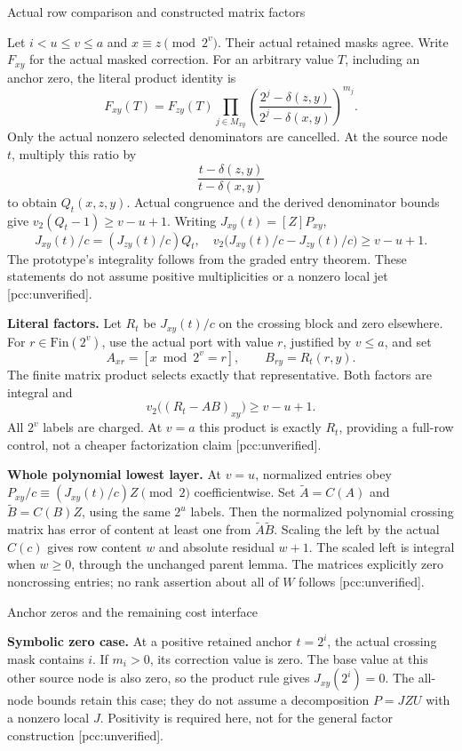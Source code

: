 \documentclass[10pt]{article}
\begin{document}
\newpage
\begin{center}{\Large Actual row comparison and constructed matrix factors}\end{center}
Let $i<u\le v\le a$ and $x\equiv z\pmod{2^v}$. Their actual retained
masks agree. Write $F_{xy}$ for the actual masked correction.
For an arbitrary value $T$, including an anchor zero, the
literal product identity is
\[
 F_{xy}(T)=F_{zy}(T)\prod_{j\in M_{xy}}
 \left(\frac{2^j-\delta(z,y)}{2^j-\delta(x,y)}\right)^{m_j}.
\]
Only the actual nonzero selected denominators are cancelled.
At the source node $t$, multiply this ratio by
\[
 \frac{t-\delta(z,y)}{t-\delta(x,y)}
\]
to obtain $Q_t(x,z,y)$. Actual congruence and the derived denominator bounds
give $v_2(Q_t-1)\ge v-u+1$. Writing $J_{xy}(t)=[Z]P_{xy}$,
\[
 J_{xy}(t)/c=(J_{zy}(t)/c)Q_t,\quad
 v_2\bigl(J_{xy}(t)/c-J_{zy}(t)/c\bigr)\ge v-u+1.
\]
The prototype's integrality follows from the graded entry theorem. These
statements do not assume positive multiplicities or a nonzero local jet
[pcc:unverified].

\textbf{Literal factors.} Let $R_t$ be $J_{xy}(t)/c$ on the crossing block
and zero elsewhere. For $r\in\mathrm{Fin}(2^v)$, use the actual port with
value $r$, justified by $v\le a$, and set
\[
 A_{xr}=[x\bmod2^v=r],\qquad B_{ry}=R_t(r,y).
\]
The finite matrix product selects exactly that representative. Both factors
are integral and
\[
 v_2\bigl((R_t-AB)_{xy}\bigr)\ge v-u+1.
\]
All $2^v$ labels are charged. At $v=a$ this product is exactly $R_t$,
providing a full-row control, not a cheaper factorization claim
[pcc:unverified].

\textbf{Whole polynomial lowest layer.} At $v=u$, normalized entries obey
$P_{xy}/c\equiv (J_{xy}(t)/c)Z\pmod2$ coefficientwise. Set
$\widetilde A=C(A)$ and $\widetilde B=C(B)Z$, using the same $2^u$ labels.
Then the normalized polynomial crossing matrix has error of content at least one from
$\widetilde A\widetilde B$. Scaling the left by the actual $C(c)$ gives
row content $w$ and absolute residual $w+1$. The scaled left is integral
when $w\ge0$, through the unchanged parent lemma. The matrices explicitly
zero noncrossing entries; no rank assertion about all of $W$ follows
[pcc:unverified].

\newpage
\begin{center}{\Large Anchor zeros and the remaining cost interface}\end{center}
\textbf{Symbolic zero case.} At a positive retained anchor $t=2^i$, the
actual crossing mask contains $i$. If $m_i>0$, its correction value is zero.
The base value at this other source node is also zero, so the product
rule gives $J_{xy}(2^i)=0$. The all-node bounds retain this case; they do not
assume a decomposition $P=JZU$ with a nonzero local $J$. Positivity is
required here, not for the general factor construction [pcc:unverified].
\end{document}
